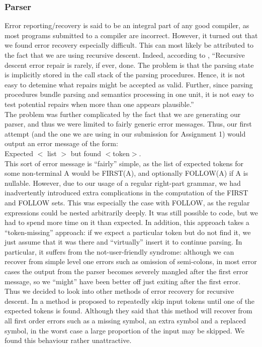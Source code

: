 \documentclass[onecolumn,11pt]{article}
\begin{document}
\subsubsection{Parser}
Error reporting/recovery is said to be an integral part of any good compiler, as most programs submitted to a compiler are incorrect. However, it turned out that we found error recovery especially difficult. This can most likely be attributed to the fact that we are using recursive descent. Indeed, according to \cite{fischer88}, ``Recursive descent error repair is rarely, if ever, done. The problem is that the parsing state is implicitly stored in the call stack of the parsing procedures. Hence, it is not easy to detemine what repairs might be accepted as valid. Further, since parsing procedures bundle parsing and semantics processing in one unit, it is not easy to test potential repairs when more than one appears plausible.'' \\

The problem was further complicated by the fact that we are generating our parser, and thus we were limited to fairly generic error messages. Thus, our first attempt (and the one we are using in our submission for Assignment 1) would output an error message of the form: \\
Expected $<$ list $>$ but found $<$token$>$. \\

This sort of error message is ``fairly'' simple, as the list of expected tokens for some non-terminal A would be FIRST(A), and optionally FOLLOW(A) if A is nullable. However, due to our usage of a regular right-part grammar, we had inadvertently introduced extra complications in the computation of the FIRST and FOLLOW sets. This was especially the case with FOLLOW, as the regular expressions could be nested arbitrarily deeply. It was still possible to code, but we had to spend more time on it than expected. In addition, this approach takes a ``token-missing'' approach: if we expect a particular token but do not find it, we just assume that it was there and ``virtually'' insert it to continue parsing. In particular, it suffers from the not-user-friendly syndrome: although we can recover from simple level one errors such as omission of semi-colons, in most error cases the output from the parser becomes severely mangled after the first error message, so we ``might'' have been better off just exiting after the first error. \\

Thus we decided to look into other methods of error recovery for recursive descent. In \cite{davie81} a method is proposed to repeatedly skip input tokens until one of the expected tokens is found. Although they said that this method will recover from all first order errors such as a missing symbol, an extra symbol and a replaced symbol, in the worst case a large proportion of the input may be skipped. We found this behaviour rather unattractive. \\
\end{document}
